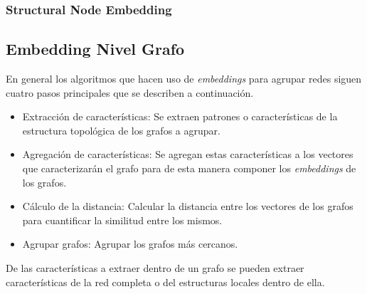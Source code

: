 \subsubsection{Structural Node Embedding}

\begin{comment}
    \begin{center}
    \begin{tabular}{ |p{8cm}|p{2cm}|  }
    \hline
    \multicolumn{2}{|c|}{Structural Node Embedding} \\
    \hline
    Paper & Algoritmo  \\
    \hline
    “Learning Structural Node Embeddings Via Diffusion Wavelets” & GraphWave  \\
    \hline
    “Learning Role-based Graph Embeddings” & Role2Vec \\
    \hline
    \end{tabular}
    \end{center}
\end{comment}


\subsection{Embedding Nivel Grafo}

En general los algoritmos que hacen uso de \textit{embeddings} para agrupar redes siguen cuatro pasos principales que se describen a continuación.

\begin{itemize}
    \item Extracción de características: Se extraen patrones o características de la estructura topológica de los grafos a agrupar.
    
    \item Agregación de características: Se agregan estas características a los vectores que caracterizarán el grafo para de esta manera componer los \textit{embeddings} de los grafos.
    
    \item Cálculo de la distancia: Calcular la distancia entre los vectores de los grafos para cuantificar la similitud entre los mismos.
    
    \item Agrupar grafos: Agrupar los grafos más cercanos.
\end{itemize}

De las características a extraer dentro de un grafo se pueden extraer características de la red completa o del estructuras locales dentro de ella.

